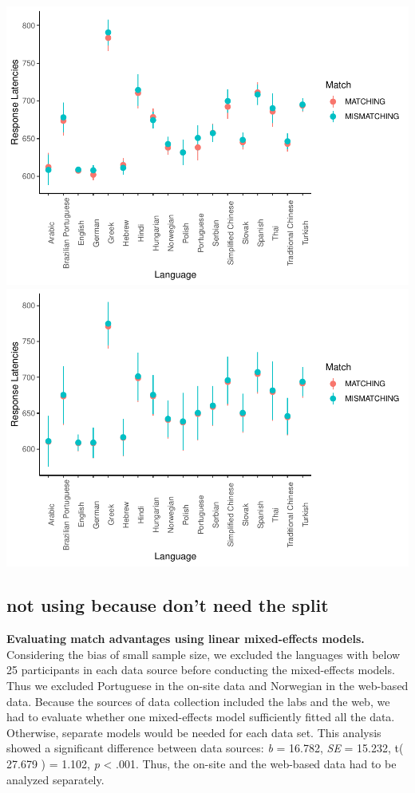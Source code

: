 \documentclass[
  man]{apa6}
\begin{document}
\includegraphics{Stage2_Report_0228_files/figure-latex/SP_lme_update-1.pdf} \includegraphics{Stage2_Report_0228_files/figure-latex/SP_lme_update-2.pdf}

\hypertarget{not-using-because-dont-need-the-split}{%
\subsection{not using because don't need the split}\label{not-using-because-dont-need-the-split}}

\textbf{Evaluating match advantages using linear mixed-effects models.} Considering the bias of small sample size, we excluded the languages with below 25 participants in each data source before conducting the mixed-effects models. Thus we excluded Portuguese in the on-site data and Norwegian in the web-based data. Because the sources of data collection included the labs and the web, we had to evaluate whether one mixed-effects model sufficiently fitted all the data. Otherwise, separate models would be needed for each data set. This analysis showed a significant difference between data sources: \emph{b} = 16.782, \emph{SE} = 15.232, t( 27.679 ) = 1.102, \emph{p} \textless{} .001. Thus, the on-site and the web-based data had to be analyzed separately.
\end{document}
